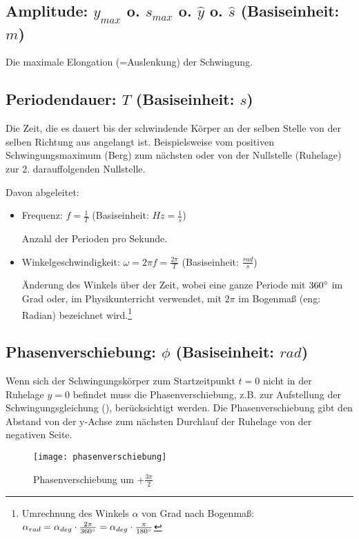 \subsection[Amplitude]{Amplitude: $y_{max}$ o. $s_{max}$ o. $\hat{y}$ o. $\hat{s}$ (Basiseinheit: $m$)}

Die maximale Elongation (=\glqq Auslenkung\grqq) der Schwingung.


\subsection[Periodendauer]{Periodendauer: $T$ (Basiseinheit: $s$)}
	
Die Zeit, die es dauert bis der schwindende Körper an der selben Stelle von der selben Richtung aus angelangt ist. Beispielsweise vom positiven Schwingungsmaximum (\glqq Berg\grqq) zum nächsten oder von der Nullstelle (\glqq Ruhelage\grqq) zur 2. darauffolgenden Nullstelle.

Davon abgeleitet:
\begin{itemize}
	\item Frequenz: $f=\frac{1}{T}$ (Basiseinheit: $Hz=\frac{1}{s}$)
	
	Anzahl der Perioden pro Sekunde.
	\item Winkelgeschwindigkeit: $\omega=2 \pi f=\frac{2 \pi}{T}$ (Basiseinheit: $\frac{rad}{s}$)
		
	Änderung des Winkels über der Zeit, wobei eine ganze Periode mit $360 \degree$ im Grad oder, im Physikunterricht verwendet, mit $2 \pi$ im Bogenmaß (eng: \glqq Radian\grqq) bezeichnet wird.\footnote{Umrechnung des Winkels $\alpha$ von Grad nach Bogenmaß: $\alpha_{rad} = \alpha_{deg} \cdot \frac{2\pi}{360 \degree} = \alpha_{deg} \cdot \frac{\pi}{180 \degree} $}
\end{itemize}


\subsection[Phasenverschiebung]{Phasenverschiebung: $\phi$ (Basiseinheit: $rad$)}
	
Wenn sich der Schwingungskörper zum Startzeitpunkt $t=0$ nicht in der Ruhelage $y=0$ befindet muss die Phasenverschiebung, z.B. zur Aufstellung der Schwingungsgleichung (), berücksichtigt werden. Die Phasenverschiebung gibt den Abstand von der y-Achse zum nächsten Durchlauf der Ruhelage von der negativen Seite.

	\begin{wrapfigure}{r}{0.5\textwidth} \label{phasenverschiebung}
	
		\vspace{-10pt}
		\texttt{[image: phasenverschiebung]}
		\vspace{-13pt}
		\caption{Phasenverschiebung um $+\frac{3\pi}{2}$}
		\vspace{-5pt}
	
	\end{wrapfigure}

